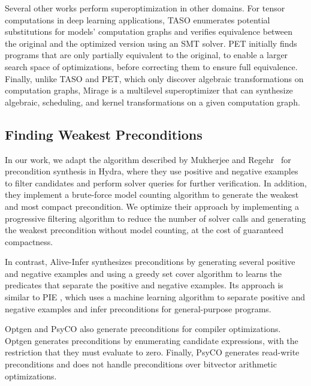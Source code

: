 \documentclass[review, anonymous, acmsmall]{acmart}
\begin{document}
Several other works perform superoptimization in other domains. For tensor computations in deep learning applications, TASO \cite{jia_taso_2019} enumerates potential substitutions for models' computation graphs and verifies equivalence between the original and the optimized version using an SMT solver. PET \cite{wang_pet_2021} initially finds programs that are only partially equivalent to the original, to enable a larger search space of optimizations, before correcting them to ensure full equivalence. Finally, unlike TASO and PET, which only discover algebraic transformations on computation graphs, Mirage \cite{wu_mirage_2025} is a multilevel superoptimizer that can synthesize algebraic, scheduling, and kernel transformations on a given computation graph. 


\subsection{Finding Weakest Preconditions}
In our work, we adapt the algorithm described by Mukherjee and Regehr~\cite{mukherjee_hydra_2024} for precondition synthesis in Hydra, where they use positive and negative examples to filter candidates and perform solver queries for further verification. In addition, they implement a brute-force model counting algorithm to generate the weakest and most compact precondition. We optimize their approach by implementing a progressive filtering algorithm to reduce the number of solver calls and generating the weakest precondition without model counting, at the cost of guaranteed compactness. 

In contrast, Alive-Infer \cite{menendez_alive-infer_2017} synthesizes preconditions by generating several positive and negative examples and using a greedy set cover algorithm to learns the predicates that separate the positive and negative examples. Its approach is similar to PIE \cite{padhi_data-driven_2016}, which uses a machine learning algorithm to separate positive and negative examples and infer preconditions for general-purpose programs.  

Optgen \cite{franke_optgen_2015} and PsyCO \cite{lopes_weakest_2014} also generate preconditions for compiler optimizations. Optgen generates preconditions by enumerating candidate expressions, with the restriction that they must evaluate to zero. Finally, PsyCO generates read-write preconditions and does not handle preconditions over bitvector arithmetic optimizations.   
\end{document}
